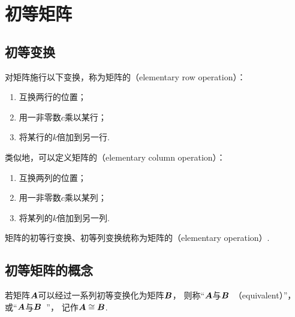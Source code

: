 \section{初等矩阵}
\subsection{初等变换}
\begin{definition}
对矩阵施行以下变换，称为矩阵的（elementary row operation）：
\begin{enumerate}
	\item 互换两行的位置；
	\item 用一非零数\(c\)乘以某行；
	\item 将某行的\(k\)倍加到另一行.
\end{enumerate}
类似地，可以定义矩阵的（elementary column operation）：
\begin{enumerate}
	\item 互换两列的位置；
	\item 用一非零数\(c\)乘以某列；
	\item 将某列的\(k\)倍加到另一列.
\end{enumerate}
矩阵的初等行变换、初等列变换统称为矩阵的（elementary operation）.
\end{definition}


\subsection{初等矩阵的概念}
\begin{definition}\label{definition:逆矩阵.矩阵等价}
若矩阵\(\boldsymbol{A}\)可以经过一系列初等变换化为矩阵\(\boldsymbol{B}\)，
则称“\(\boldsymbol{A}\)与\(\boldsymbol{B}\)~（equivalent）”，
或“\(\boldsymbol{A}\)与\(\boldsymbol{B}\)~”，
记作\(\boldsymbol{A}\cong\boldsymbol{B}\).
\end{definition}


